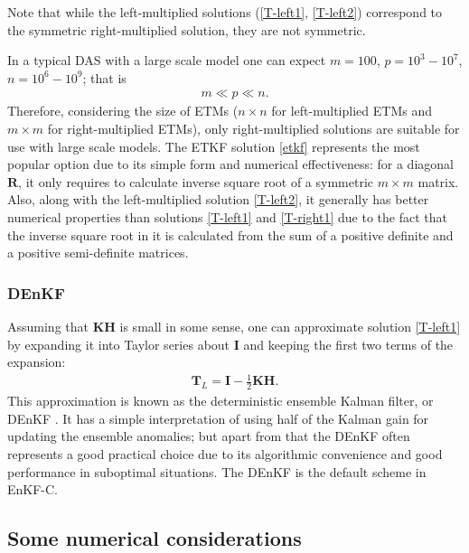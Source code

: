 \documentclass[11pt]{report}
\newcommand{\mb} {\mathbf}
\begin{document}
Note that while the left-multiplied solutions (\ref{T-left1}, \ref{T-left2}) correspond to the symmetric right-multiplied solution, they are not symmetric.

In a typical DAS with a large scale model one can expect $m = 100$, $p = 10^3-10^7$, $n = 10^6-10^9$; that is
\begin{align}
  m \ll p \ll n.
\end{align}
Therefore, considering the size of ETMs ($n \times n$ for left-multiplied ETMs and $m \times m$ for right-multiplied ETMs), only right-multiplied solutions are suitable for use with large scale models.
The ETKF solution \eqref{etkf} represents the most popular option due to its simple form and numerical effectiveness: for a diagonal $\mb R$, it only requires to calculate inverse square root of a symmetric $m \times m$ matrix.
Also, along with the left-multiplied solution \eqref{T-left2}, it generally has better numerical properties than solutions \eqref{T-left1} and \eqref{T-right1} due to the fact that the inverse square root in it is calculated from the sum of a positive definite and a positive semi-definite matrices.

\subsubsection{DEnKF}

Assuming that $\mb K \mb H$ is small in some sense, one can approximate solution \eqref{T-left1} by expanding it into Taylor series about $\mb I$ and keeping the first two terms of the expansion:
\begin{align}
  \label{denkf}
  \mb T_L = \mb I - \frac{1}{2} \mb K \mb H.
\end{align}
This approximation is known as the deterministic ensemble Kalman filter, or DEnKF \citep{sak08a}.
It has a simple interpretation of using half of the Kalman gain for updating the ensemble anomalies; but apart from that the DEnKF often represents a good practical choice due to its algorithmic convenience and good performance in suboptimal situations.
The DEnKF is the default scheme in EnKF-C.

\subsection{Some numerical considerations}
\label{sec:numerical}
\end{document}
